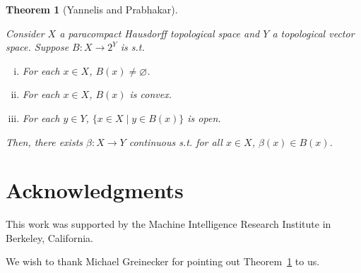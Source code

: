 \documentclass[11pt]{article}
\theoremstyle{definition}
\theoremstyle{plain}
\newtheorem{theorem}{Theorem}%
\begin{document}
\begin{samepage}
\begin{theorem} [Yannelis and Prabhakar]
\label{thm:selection}

Consider $X$ a paracompact Hausdorff topological space and $Y$ a topological vector space. Suppose $B: X \rightarrow 2^Y$ is s.t.

\begin{enumerate}[i.]

\item For each $x \in X$, $B(x) \ne \varnothing$.
\item For each $x \in X$, $B(x)$ is convex.
\item For each $y \in Y$, $\{x \in X \mid y \in B(x)\}$ is open.

\end{enumerate}

Then, there exists $\beta: X \rightarrow Y$ continuous s.t. for all $x \in X$, $\beta(x) \in B(x)$.

\end{theorem}
\end{samepage}

\section*{Acknowledgments}

This work was supported by the Machine Intelligence Research Institute in Berkeley, California.

We wish to thank Michael Greinecker for pointing out Theorem~\ref{thm:selection} to us.



\end{document}
